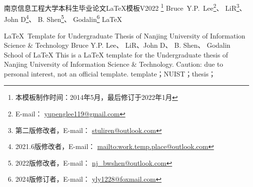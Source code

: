 \maketitleofchinese
{
南京信息工程大学本科生毕业论文\LaTeX{}模板V2022
\footnote{本模板制作时间：2014年5月，最后修订于2022年1月}
}{
Bruce~Y.P.~Lee\footnote{E-mail：
  \url{yupenglee119@gmail.com}}、
LiR\footnote{第二版修改者，E-mail：
  \url{stuliren@outlook.com}}、
John D\footnote{2021.6版修改者，E-mail：
  \url{mailto:work.temp.place@outlook.com}}、
B. Shen\footnote{2022版修改者，E-mail：
  \href{mailto:nj\_bwshen@outlook.com}{nj\_bwshen@outlook.com}}、
Godalin\footnote{2024版修订者，E-mail：
  \href{mailto:yly1228@foxmail.com}{yly1228@foxmail.com}}
}{
\LaTeX{}
}



\maketitleofenglish
{
\LaTeX\ Template for Undergraduate Thesis of Nanjing University of Information Science \& Technology
}{
Bruce Y.P. Lee、
LiR、John D、
B. Shen、
Godalin
}{
School of \LaTeX{}
}
\abstractofenglish
{
This is a \LaTeX{} template for the Undergraduate thesis of Nanjing University of Information Science \& Technology.
Caution: due to personal interest, not an official template.
}{
template；NUIST；thesis；
}
